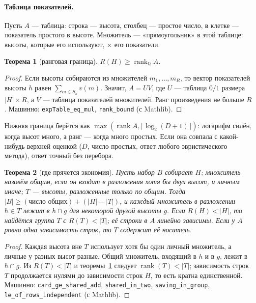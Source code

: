 \documentclass[11pt,a4paper]{article}
\theoremstyle{plain}
\newtheorem{theorem}{Теорема}[section]
\theoremstyle{definition}
\theoremstyle{remark}
\newcommand{\lean}[1]{\texttt{#1}}
\begin{document}
\paragraph{Таблица показателей.} Пусть $A$ — таблица: строка — высота, столбец — простое число, в клетке — показатель простого в высоте. Множитель — «прямоугольник» в этой таблице: высоты, которые его используют, $\times$ его показатели.

\begin{theorem}[ранговая граница]\label{thm:rank}
$R(H)\ge\operatorname{rank}_{\mathbb Q}A$.
\end{theorem}
\begin{proof}
Если высоты собираются из множителей $m_1,\dots,m_R$, то вектор показателей высоты $h$ равен $\sum_{m\in S_h}v(m)$. Значит, $A=UV$, где $U$ — таблица $0/1$ размера $|H|\times R$, а $V$ — таблица показателей множителей. Ранг произведения не больше $R$. Машинно: \lean{expTable\_eq\_mul}, \lean{rank\_bound} (с Mathlib).
\end{proof}

Нижняя граница берётся как $\max(\operatorname{rank}A,\lceil\log_2(D+1)\rceil)$: логарифм силён, когда высот много, а ранг — когда много простых. Если она совпала с какой-нибудь верхней оценкой ($D$, число простых, ответ любого эвристического метода), ответ точный без перебора.

\begin{theorem}[где прячется экономия]\label{thm:tree}
Пусть набор $B$ собирает $H$; множитель назовём общим, если он входит в разложения хотя бы двух высот, и личным иначе; $T$ — высоты, разложенные только по общим. Тогда $|B|\ge(\text{число общих})+(|H|-|T|)$, и каждый множитель в разложении $h\in T$ лежит в $h\cap g$ для некоторой другой высоты $g$. Если $R(H)<|H|$, то найдётся группа $T$ с $R(T)<|T|$; её строки в $A$ линейно зависимы. Если у $A$ ровно одна зависимость строк, то $T$ содержит её носитель.
\end{theorem}
\begin{proof}
Каждая высота вне $T$ использует хотя бы один личный множитель, а личные у разных высот разные. Общий множитель, входящий в $h$ и в $g$, лежит в $h\cap g$. Из $R(T)<|T|$ и теоремы~\ref{thm:rank} следует $\operatorname{rank}(T)<|T|$; зависимость строк $T$ продолжается нулями до зависимости строк $H$, то есть кратна единственной. Машинно: \lean{card\_ge\_shared\_add}, \lean{shared\_in\_two}, \lean{saving\_in\_group}, \lean{le\_of\_rows\_independent} (с Mathlib).
\end{proof}
\end{document}
